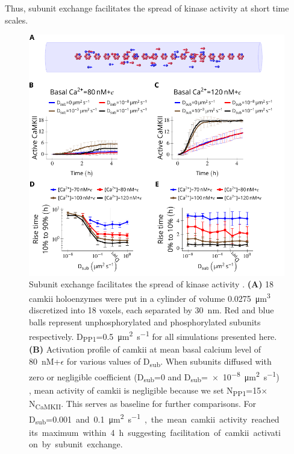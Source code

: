 \documentclass[9pt,lineno,doublespacing]{elife}
\newcommand\SUB[2]{#1\textsubscript{#2}}
\begin{document}
Thus, subunit exchange facilitates the spread of kinase activity at short time
scales.

\begin{figure}
    \includegraphics[width=0.95\linewidth]{./PaperFigures/elifeFigure4/figure_camkii_activation_130mm.pdf}
    \caption{
        Subunit exchange facilitates the spread of kinase activity
        \citep{stratton_activation-triggered_2014}. \textbf{(A)} 18 \gls{camkii} holoenzymes 
        were put in a cylinder of volume \SI{0.0275}{\cubic\micro\meter} discretized into 18
        voxels, each separated by \SI{30}{\nano\meter}. Red and blue balls
        represent unphosphorylated and phosphorylated subunits respectively.
        \SUB{D}{PP1}=\SI{0.5}{\micro\meter\squared\per\second} for all
        simulations presented here. 
        \textbf{(B)} Activation profile of \gls{camkii} at mean basal calcium
        level of \SI{80}{\nano M}+$\epsilon$ for various values of 
        \SUB{D}{sub}. When subunits diffused with zero or negligible coefficient
        (\SUB{D}{sub}=0 and \SUB{D}{sub}=\SI{e-8}{\micro\meter\squared\per\second})
        , mean activity of \gls{camkii} is negligible because we set
        \SUB{N}{PP1}=15$\times$\SUB{N}{CaMKII}. This serves as baseline for
        further comparisons. For \SUB{D}{sub}=\SI{0.001} and
        \SI{0.1}{\micro\meter\squared\per\second}, the mean \gls{camkii}
        activity reached its maximum within \SI{4}{\hour} suggesting facilitation
        of \gls{camkii} activation by subunit exchange.
}
\end{figure}
\end{document}
